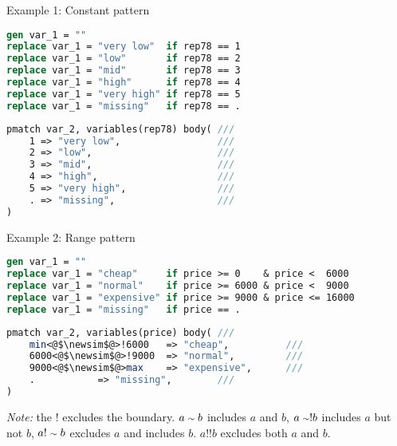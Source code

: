 \documentclass[11pt]{beamer}
\let\newsim\sim
\renewcommand{\newsim}{\mathrel{\mathpalette\bueckirel\sim}}
\newcommand{\bueckirel}[2]{%
  \raisebox{\depth}{\scalebox{0.808}{$#1#2$}}%
}
\begin{document}
\begin{frame}[fragile]{Example 1: Constant pattern}
\label{example_1}

\footnotesize
\begin{lstlisting}[language=Stata]
gen var_1 = ""
replace var_1 = "very low"  if rep78 == 1
replace var_1 = "low"       if rep78 == 2
replace var_1 = "mid"       if rep78 == 3
replace var_1 = "high"      if rep78 == 4
replace var_1 = "very high" if rep78 == 5
replace var_1 = "missing"   if rep78 == .
\end{lstlisting}

\begin{lstlisting}[language=Stata]
pmatch var_2, variables(rep78) body( ///
    1 => "very low",                 ///
    2 => "low",                      ///
    3 => "mid",                      ///
    4 => "high",                     ///
    5 => "very high",                ///
    . => "missing",                  ///
)
\end{lstlisting}

\end{frame}

\begin{frame}[fragile]{Example 2: Range pattern}
\label{example_2}

\footnotesize
\begin{lstlisting}[language=Stata]
gen var_1 = ""
replace var_1 = "cheap"     if price >= 0    & price <  6000
replace var_1 = "normal"    if price >= 6000 & price <  9000
replace var_1 = "expensive" if price >= 9000 & price <= 16000
replace var_1 = "missing"   if price == .
\end{lstlisting}

\begin{lstlisting}[language=Stata]
pmatch var_2, variables(price) body( ///
    min<@$\newsim$@>!6000   => "cheap",          ///
    6000<@$\newsim$@>!9000  => "normal",         ///
    9000<@$\newsim$@>max    => "expensive",      ///
    .           => "missing",        ///
)
\end{lstlisting}

\textit{Note:} the $!$ excludes the boundary.
$a \newsim b$ includes $a$ and $b$, $a \newsim ! b$ includes $a$ but not $b$, $a !\newsim b$ excludes $a$ and includes $b$. $a !! b$ excludes both $a$ and $b$.

\end{frame}
\end{document}
